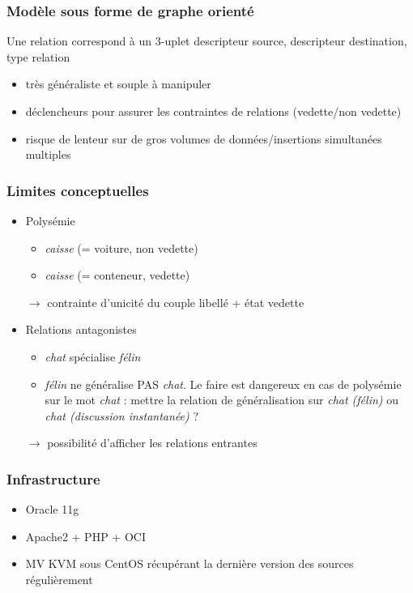 \documentclass{beamer}
\begin{document}
\begin{frame}
\frametitle{Modèle sous forme de graphe orienté}
Une relation correspond à un 3-uplet descripteur source, descripteur destination, type relation
\begin{itemize}
\item très généraliste et souple à manipuler
\item déclencheurs pour assurer les contraintes de relations (vedette/non vedette)
\item risque de lenteur sur de gros volumes de données/insertions simultanées multiples
\end{itemize}
\end{frame}


\begin{frame}
\frametitle{Limites conceptuelles}
\begin{itemize}
\item Polysémie
\begin{itemize}
\item \emph{caisse} (= voiture, non vedette)
\item \emph{caisse} (= conteneur, vedette)
\end{itemize}
$\rightarrow$ contrainte d'unicité du couple libellé + état vedette

\item Relations antagonistes
\begin{itemize}
\item \emph{chat} spécialise \emph{félin}
\item \emph{félin} ne généralise PAS \emph{chat}. Le faire est dangereux en cas de polysémie sur le mot \emph{chat} : mettre la relation de généralisation sur \emph{chat (félin)} ou \emph{chat (discussion instantanée)} ?
\end{itemize}
$\rightarrow$ possibilité d'afficher les relations entrantes
\end{itemize}
\end{frame}


\begin{frame}
\frametitle{Infrastructure}
\begin{itemize}
\item Oracle 11g
\item Apache2 + PHP + OCI
\item MV KVM sous CentOS récupérant la dernière version des sources régulièrement
\end{itemize}
\end{frame}
\end{document}

